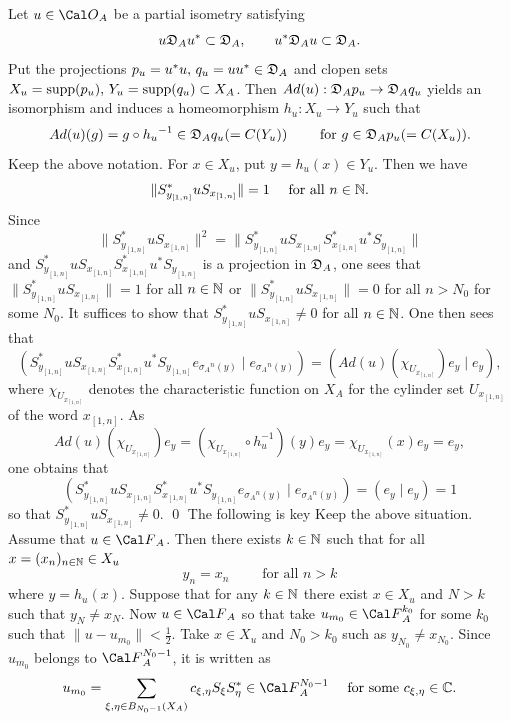 Let $u \in \OA$ be a partial isometry satisfying 
$$
u {{\frak D}_A} u^* \subset {{\frak D}_A}, \qquad
u^* {{\frak D}_A} u \subset {{\frak D}_A}.
$$
Put the projections
$p_u = u^* u, \, q_u = u u^* \in {{\frak D}_A}$
and clopen sets
$X_u = {{\operatorname{supp}}}(p_u), \, Y_u = {{\operatorname{supp}}}(q_u) \subset X_A$.
Then $Ad(u) : {{\frak D}_A} p_u \rightarrow {{\frak D}_A} q_u$ 
yields an isomorphism
and induces a homeomorphism
$h_u: X_u \rightarrow Y_u$ such that
$$
Ad(u)(g) = g \circ {h_u}^{-1} \in {{\frak D}_A} q_u (=C(Y_u))\qquad \text{ for }
g \in {{\frak D}_A} p_u(= C(X_u)).
$$
Keep the above notation.
For $x \in X_u$, put $ y = h_u(x) \in Y_u$.
Then we have
$$
\| S^*_{y_{[1,n]}} u S_{x_{[1,n]}} \| = 1
\quad \text{ for all } n \in {\Bbb N}. 
$$
\endproclaim
{}
Since
$$
\|  S^*_{y_{[1,n]}} u S_{x_{[1,n]}} \|^2
 = \| S^*_{y_{[1,n]}} u S_{x_{[1,n]}}S_{x_{[1,n]}}^* u^* S_{y_{[1,n]}} \| 
$$
and
$S^*_{y_{[1,n]}} u S_{x_{[1,n]}}S_{x_{[1,n]}}^* u^* S_{y_{[1,n]}}$
is a projection in ${{\frak D}_A}$,
one sees that 
$
\| S^*_{y_{[1,n]}} u S_{x_{[1,n]}} \| = 1
$
for all 
$
n \in {\Bbb N}
$
or 
$
\| S^*_{y_{[1,n]}} u S_{x_{[1,n]}} \| = 0
$
for all $n > N_0$ for some $N_0$.
It suffices to show that
$S^*_{y_{[1,n]}} u S_{x_{[1,n]}} \ne 0$ for all
$n \in \Bbb N$.
One then sees that
$$
(S^*_{y_{[1,n]}} u S_{x_{[1,n]}}
S_{x_{[1,n]}}^* u^* S_{y_{[1,n]}} 
e_{{\sigma_A}^n(y)} \mid  e_{{\sigma_A}^n(y)})
= ( Ad(u)(\chi_{U_{x_{[1,n]}}})e_y \mid e_y), 
$$
where
$\chi_{U_{x_{[1,n]}}}$ denotes the characteristic function on $X_A$
for the cylinder set $U_{x_{[1,n]}}$ of the word $x_{[1,n]}$.
As 
$$
Ad(u)(\chi_{U_{x_{[1,n]}}})e_y  
= (\chi_{U_{x_{[1,n]}}}\circ h_u^{-1})(y) e_y
= \chi_{U_{x_{[1,n]}}}(x) e_y
=e_y,
$$
one obtains that
$$
(S^*_{y_{[1,n]}} u S_{x_{[1,n]}}
S_{x_{[1,n]}}^* u^* S_{y_{[1,n]}} 
e_{{\sigma_A}^n(y)} \mid  e_{{\sigma_A}^n(y)})
= (e_y \mid e_y ) =1
$$
so that
$
S^*_{y_{[1,n]}} u S_{x_{[1,n]}} \ne 0.
$
\qed
\enddemo
The following is key
Keep the above situation.
Assume that $u \in \FA$.
Then  there exists $k \in \Bbb N$ such that
for  all 
$
x=(x_n )_{n \in {\Bbb N}} \in X_u
$
$$
y_n = x_n
\qquad
\text{ for all }n > k
$$
where $y = h_u(x)$.
\endproclaim
{}
Suppose that for any $k \in {\Bbb N}$
there exist $x \in X_u$ and $N >k$ such that
$y_N \ne x_N$.
Now $u \in \FA$ so that take $u_{m_0} \in {\Cal F}_A^{k_0}$
 for some $k_0$ such that
$ \| u - u_{m_0} \| < \frac{1}{2}.$
Take $ x \in X_u$ and $N_0 > k_0$ such as $y_{N_0} \ne x_{N_0}$.
Since $u_{m_0}$ 
belongs to ${\Cal F}_A^{N_0-1}$,
it is written 
as 
$$
u_{m_0} = \sum_{\xi, \eta \in B_{N_0-1}(X_A)} 
c_{\xi,\eta}S_\xi S_\eta^* \in {\Cal F}_A^{N_0-1}
\quad \text{ for some } c_{\xi, \eta} \in {\Bbb C}.
$$
